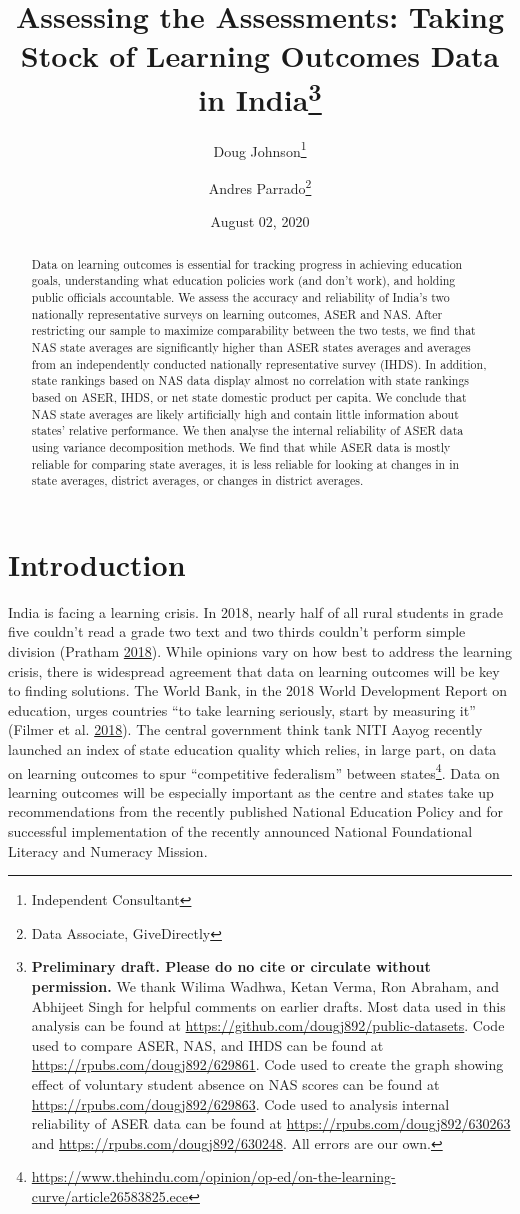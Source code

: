 \documentclass[
  11pt,
]{article}
\title{Assessing the Assessments: Taking Stock of Learning Outcomes Data in India\thanks{\textbf{Preliminary draft. Please do no cite or circulate without permission.} We thank Wilima Wadhwa, Ketan Verma, Ron Abraham, and Abhijeet Singh for helpful comments on earlier drafts. Most data used in this analysis can be found at \url{https://github.com/dougj892/public-datasets}. Code used to compare ASER, NAS, and IHDS can be found at \url{https://rpubs.com/dougj892/629861}. Code used to create the graph showing effect of voluntary student absence on NAS scores can be found at \url{https://rpubs.com/dougj892/629863}. Code used to analysis internal reliability of ASER data can be found at \url{https://rpubs.com/dougj892/630263} and \url{https://rpubs.com/dougj892/630248}. All errors are our own.}}
\author{Doug Johnson\footnote{Independent Consultant} \and Andres Parrado\footnote{Data Associate, GiveDirectly}}
\date{August 02, 2020}
\begin{document}
\maketitle
\begin{abstract}
Data on learning outcomes is essential for tracking progress in achieving education goals, understanding what education policies work (and don't work), and holding public officials accountable. We assess the accuracy and reliability of India's two nationally representative surveys on learning outcomes, ASER and NAS. After restricting our sample to maximize comparability between the two tests, we find that NAS state averages are significantly higher than ASER states averages and averages from an independently conducted nationally representative survey (IHDS). In addition, state rankings based on NAS data display almost no correlation with state rankings based on ASER, IHDS, or net state domestic product per capita. We conclude that NAS state averages are likely artificially high and contain little information about states' relative performance. We then analyse the internal reliability of ASER data using variance decomposition methods. We find that while ASER data is mostly reliable for comparing state averages, it is less reliable for looking at changes in in state averages, district averages, or changes in district averages.
\end{abstract}

\newpage

\hypertarget{introduction}{%
\section{Introduction}\label{introduction}}

India is facing a learning crisis. In 2018, nearly half of all rural students in grade five couldn't read a grade two text and two thirds couldn't perform simple division (Pratham \protect\hyperlink{ref-aser2018}{2018}). While opinions vary on how best to address the learning crisis, there is widespread agreement that data on learning outcomes will be key to finding solutions. The World Bank, in the 2018 World Development Report on education, urges countries ``to take learning seriously, start by measuring it'' (Filmer et al. \protect\hyperlink{ref-filmer2018learning}{2018}). The central government think tank NITI Aayog recently launched an index of state education quality which relies, in large part, on data on learning outcomes to spur ``competitive federalism'' between states\footnote{\url{https://www.thehindu.com/opinion/op-ed/on-the-learning-curve/article26583825.ece}}. Data on learning outcomes will be especially important as the centre and states take up recommendations from the recently published National Education Policy and for successful implementation of the recently announced National Foundational Literacy and Numeracy Mission.
\end{document}
